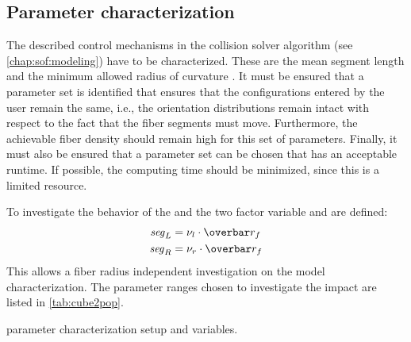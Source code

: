 \subsection{Parameter characterization}\label{sec:modelSetup}
% 
The described control mechanisms in the collision solver algorithm  (see \cref{chap:sof:modeling}) have to be characterized.
These are the mean segment length \segLength{} and the minimum allowed radius of curvature \segRadius{}.
It must be ensured that a parameter set is identified that ensures that the configurations entered by the user remain the same, i.e., the orientation distributions remain intact with respect to the fact that the fiber segments must move.
Furthermore, the achievable fiber density should remain high for this set of parameters.
Finally, it must also be ensured that a parameter set can be chosen that has an acceptable runtime.
If possible, the computing time should be minimized, since this is a limited resource.
\par
% 
To investigate the behavior of the \segLength{} and \segRadius{} the two factor variable \segLengthFactor{} and \segRadiusFactor{} are defined:
\begin{align}
    \begin{split}
        \segLength &= \segLengthFactor \cdot \fiberRadiusMean\\
        \segRadius &= \segRadiusFactor \cdot \fiberRadiusMean
    \end{split}
\end{align}
This allows a fiber radius independent investigation on the model characterization.
The parameter ranges chosen to investigate the impact are listed in \cref{tab:cube2pop}.
% 
\begin{table}[!b]
%
\centering
{}
\caption{parameter characterization setup and variables.}
\label{tab:parameterSeries}
\end{table}
